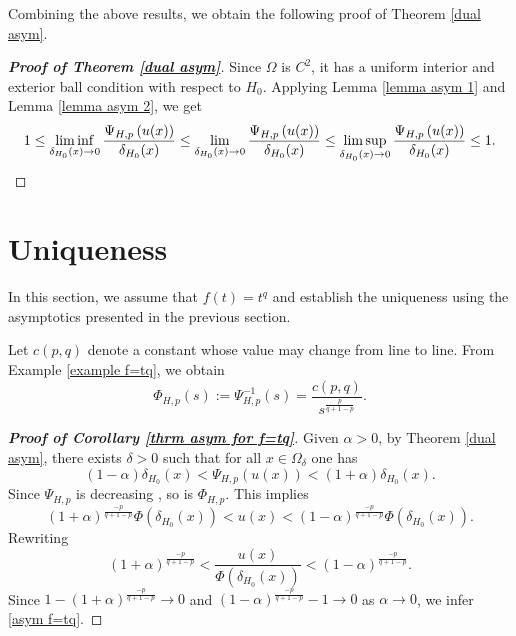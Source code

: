 \documentclass[11pt]{amsart}
\numberwithin{equation}{section}
\begin{document}
Combining the above results, we obtain the following proof of Theorem \ref{dual asym}.
    \begin{proof}[\textbf{Proof of Theorem \ref{dual asym}}]
        Since $\Omega$ is $C^{2}$, it has a uniform interior and exterior ball condition with respect to $H_{0}$. Applying Lemma \ref{lemma asym 1} and Lemma \ref{lemma asym 2}, we get 
        \begin{equation*}
            1\leq \liminf_{\delta_{H_{0}}(x)\to 0}\frac{\Psi_{H,p}\left(u(x)\right)}{\delta_{H_{0}}(x)}\leq \lim_{\delta_{H_{0}}(x)\to 0}\frac{\Psi_{H,p}\left(u(x)\right)}{\delta_{H_{0}}(x)}\leq  \limsup_{\delta_{H_{0}}(x)\to 0}\frac{\Psi_{H,p}\left(u(x)\right)}{\delta_{H_{0}}(x)}\leq 1.\qedhere
        \end{equation*}
    \end{proof}

    \section{Uniqueness}\label{uniqueness}
    In this section, we assume that $f(t)=t^{q}$ and establish the uniqueness using the asymptotics presented in the previous section.

   
    Let $c(p,q)$ denote a constant whose value may change from line to line. From Example \ref{example f=tq}, we obtain
    \begin{equation*}
        \Phi_{H,p}(s):=\Psi^{-1}_{H,p}(s)=\frac{c(p,q)}{s^{\frac{p}{q+1-p}}}.
    \end{equation*}
   
    \begin{proof}[\textbf{Proof of Corollary  \ref{thrm asym for f=tq}}]
     Given $\alpha>0$,  by Theorem \ref{dual asym}, there exists $\delta>0$ such that for all $x\in \Omega_{\delta}$ one has 
    \begin{equation*}
        (1-\alpha)\delta_{H_{0}}(x)<\Psi_{H,p}\left(u(x)\right)<(1+\alpha)\delta_{H_{0}}(x).
    \end{equation*}
    Since $\Psi_{H,p}$ is decreasing , so is $\Phi_{H,p}$. This implies 
    \begin{equation*}
        (1+\alpha)^{\frac{-p}{q+1-p}}\Phi(\delta_{H_{0}}(x))<u(x)<(1-\alpha)^{\frac{-p}{q+1-p}}\Phi(\delta_{H_{0}}(x)).
    \end{equation*}
    Rewriting 
    \begin{equation*}
        (1+\alpha)^{\frac{-p}{q+1-p}}<\frac{u(x)}{\Phi(\delta_{H_{0}}(x))}<(1-\alpha)^{\frac{-p}{q+1-p}}.
    \end{equation*}
    Since $1-(1+\alpha)^{\frac{-p}{q+1-p}}\to 0$ and $(1-\alpha)^{\frac{-p}{q+1-p}}-1\to 0$ as $\alpha\to 0$, we infer \eqref{asym f=tq}.
    \end{proof}
   
\end{document}
